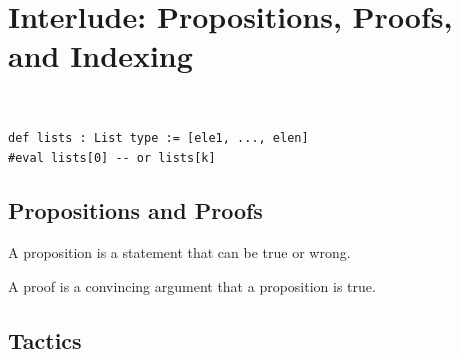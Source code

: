\documentclass{article}
\begin{document}
\section{Interlude: Propositions, Proofs, and Indexing}
\begin{definition}~
    \begin{verbatim}
def lists : List type := [ele1, ..., elen]
#eval lists[0] -- or lists[k]
\end{verbatim}
\end{definition}

\subsection{Propositions and Proofs}
\begin{definition}[proposition]
    A proposition is a statement that can be true or wrong.
\end{definition}

\begin{definition}[proof]
    A proof is a convincing argument that a proposition is true.
\end{definition}

\begin{definition}[theorem]

\end{definition}

\subsection{Tactics}


\printbibliography
\end{document}
